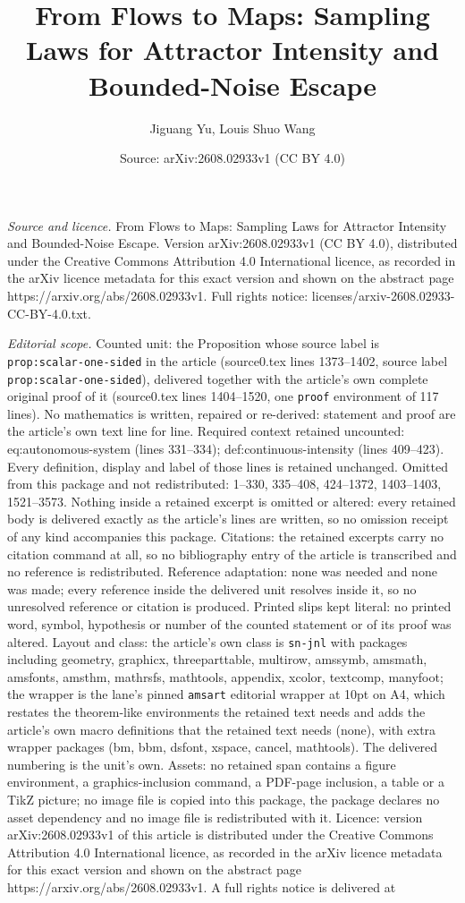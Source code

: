 \documentclass[10pt,a4paper]{amsart}
\title[From Flows to Maps: Sampling Laws for Attractor Intensity an]{From Flows to Maps: Sampling Laws for Attractor Intensity and Bounded-Noise Escape}
\author{Jiguang Yu, Louis Shuo Wang}
\date{Source: arXiv:2608.02933v1 (CC BY 4.0)}
\begin{document}
\maketitle

\noindent\emph{Source and licence.} From Flows to Maps: Sampling Laws for Attractor Intensity and Bounded-Noise Escape. Version arXiv:2608.02933v1 (CC BY 4.0), distributed under the Creative Commons Attribution 4.0 International licence, as recorded in the arXiv licence metadata for this exact version and shown on the abstract page https://arxiv.org/abs/2608.02933v1. Full rights notice: licenses/arxiv-2608.02933-CC-BY-4.0.txt.\par\smallskip

\noindent\textit{Editorial scope.} Counted unit: the Proposition whose source label is \texttt{prop:scalar-one-sided} in the article (source0.tex lines 1373--1402, source label \texttt{prop:scalar-one-sided}), delivered together with the article's own complete original proof of it (source0.tex lines 1404--1520, one \texttt{proof} environment of 117 lines). No mathematics is written, repaired or re-derived: statement and proof are the article's own text line for line. Required context retained uncounted: eq:autonomous-system (lines 331--334); def:continuous-intensity (lines 409--423). Every definition, display and label of those lines is retained unchanged. Omitted from this package and not redistributed: 1--330, 335--408, 424--1372, 1403--1403, 1521--3573. Nothing inside a retained excerpt is omitted or altered: every retained body is delivered exactly as the article's lines are written, so no omission receipt of any kind accompanies this package. Citations: the retained excerpts carry no citation command at all, so no bibliography entry of the article is transcribed and no reference is redistributed. Reference adaptation: none was needed and none was made; every reference inside the delivered unit resolves inside it, so no unresolved reference or citation is produced. Printed slips kept literal: no printed word, symbol, hypothesis or number of the counted statement or of its proof was altered. Layout and class: the article's own class is \texttt{sn-jnl} with packages including geometry, graphicx, threeparttable, multirow, amssymb, amsmath, amsfonts, amsthm, mathrsfs, mathtools, appendix, xcolor, textcomp, manyfoot; the wrapper is the lane's pinned \texttt{amsart} editorial wrapper at 10pt on A4, which restates the theorem-like environments the retained text needs and adds the article's own macro definitions that the retained text needs (none), with extra wrapper packages (bm, bbm, dsfont, xspace, cancel, mathtools). The delivered numbering is the unit's own. Assets: no retained span contains a figure environment, a graphics-inclusion command, a PDF-page inclusion, a table or a TikZ picture; no image file is copied into this package, the package declares no asset dependency and no image file is redistributed with it. Licence: version arXiv:2608.02933v1 of this article is distributed under the Creative Commons Attribution 4.0 International licence, as recorded in the arXiv licence metadata for this exact version and shown on the abstract page https://arxiv.org/abs/2608.02933v1. A full rights notice is delivered at 
\end{document}
